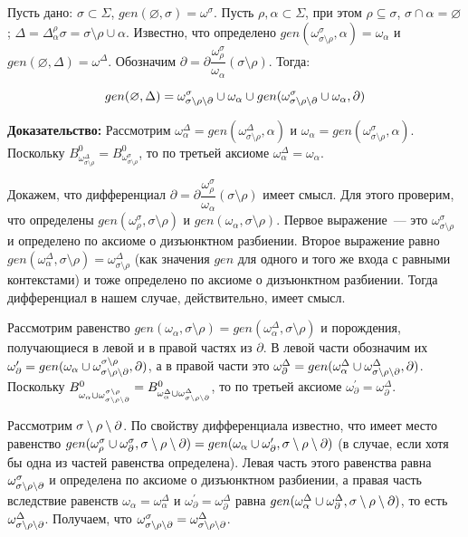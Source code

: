 Пусть дано: $\sigma \subset \Sigma$, $gen(\varnothing, \sigma) = \omega^\sigma$. Пусть $\rho, \alpha \subset \Sigma$, при этом $\rho \subseteq \sigma$, $\sigma \cap \alpha = \varnothing$; $\Delta = \Delta^\rho_\alpha\sigma = \sigma\setminus\rho\cup\alpha$. Известно, что определено $gen(\omega^\sigma_{\sigma\setminus\rho}, \alpha) = \omega_\alpha$ и $gen(\varnothing, \Delta) = \omega^\Delta$. Обозначим $\partial = \partial\dfrac{\omega^\sigma_\rho}{\omega_\alpha}(\sigma\setminus\rho)$.
Тогда:

$$gen(\varnothing, \Delta) = \omega^\sigma_{\sigma\setminus\rho\setminus\partial} \cup \omega_\alpha \cup gen(\omega^\sigma_{\sigma\setminus\rho\setminus\partial} \cup \omega_\alpha, \partial)$$

\textbf{Доказательство:}
Рассмотрим $\omega^\Delta_\alpha = gen(\omega^\Delta_{\sigma\setminus\rho}, \alpha)$ и $\omega_\alpha = gen(\omega^\sigma_{\sigma\setminus\rho}, \alpha)$. Поскольку $B^0_{\omega^\Delta_{\sigma\setminus\rho}} = B^0_{\omega^\sigma_{\sigma\setminus\rho}}$, то по третьей аксиоме $\omega^\Delta_\alpha = \omega_\alpha$.

Докажем, что дифференциал $\partial = \partial\dfrac{\omega^\sigma_\rho}{\omega_\alpha}(\sigma\setminus\rho)$ имеет смысл. Для этого проверим, что определены $gen(\omega^\sigma_\rho, \sigma\setminus\rho)$ и $gen(\omega_\alpha, \sigma\setminus\rho)$. Первое выражение~--- это $\omega^\sigma_{\sigma\setminus\rho}$ и определено по аксиоме о дизъюнктном разбиении. Второе выражение равно $gen(\omega^\Delta_\alpha, \sigma\setminus\rho) = \omega^\Delta_{\sigma\setminus\rho}$ (как значения $gen$ для одного и того же входа с равными контекстами) и тоже определено по аксиоме о дизъюнктном разбиении. Тогда дифференциал в нашем случае, действительно, имеет смысл.

Рассмотрим равенство $gen(\omega_\alpha, \sigma\setminus\rho) = gen(\omega^\Delta_\alpha, \sigma\setminus\rho)$ и порождения, получающиеся в левой и в правой частях из $\partial$. В левой части обозначим их $\omega^\prime_\partial = gen(\omega_\alpha \cup \omega^{\sigma\setminus\rho}_{\sigma\setminus\rho\setminus\partial}, \partial)$, а в правой части это $\omega^\Delta_\partial = gen(\omega^\Delta_\alpha \cup \omega^\Delta_{\sigma\setminus\rho\setminus\partial}, \partial)$. Поскольку $B^0_{\omega_\alpha \cup \omega^{\sigma\setminus\rho}_{\sigma\setminus\rho\setminus\partial}} = B^0_{\omega^\Delta_\alpha \cup \omega^\Delta_{\sigma\setminus\rho\setminus\partial}}$, то по третьей аксиоме $\omega^\prime_\partial = \omega^\Delta_\partial$.

Рассмотрим $\sigma\setminus\rho\setminus\partial$. По свойству дифференциала известно, что имеет место равенство $gen(\omega^\sigma_\rho \cup \omega^\sigma_\partial, \sigma\setminus\rho\setminus\partial) = gen(\omega_\alpha \cup \omega^\prime_\partial, \sigma\setminus\rho\setminus\partial)$ (в случае, если хотя бы одна из частей равенства определена). Левая часть этого равенства равна $\omega^\sigma_{\sigma\setminus\rho\setminus\partial}$ и определена по аксиоме о дизъюнктном разбиении, а правая часть вследствие равенств $\omega_\alpha = \omega^\Delta_\alpha$ и $\omega^\prime_\partial = \omega^\Delta_\partial$ равна $gen(\omega^\Delta_\alpha \cup \omega^\Delta_\partial, \sigma\setminus\rho\setminus\partial)$, то есть $\omega^\Delta_{\sigma\setminus\rho\setminus\partial}$. Получаем, что $\omega^\sigma_{\sigma\setminus\rho\setminus\partial} = \omega^\Delta_{\sigma\setminus\rho\setminus\partial}$.

